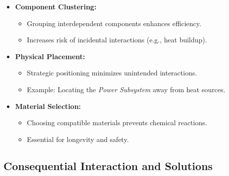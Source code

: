 \documentclass[12pt]{report}
\begin{document}
\begin{itemize}
    \item \textbf{Component Clustering:}
    \begin{itemize}
        \item Grouping interdependent components enhances efficiency.
        \item Increases risk of incidental interactions (e.g., heat buildup).
    \end{itemize}
    \item \textbf{Physical Placement:}
    \begin{itemize}
        \item Strategic positioning minimizes unintended interactions.
        \item Example: Locating the \textit{Power Subsystem} away from heat sources.
    \end{itemize}
    \item \textbf{Material Selection:}
    \begin{itemize}
        \item Choosing compatible materials prevents chemical reactions.
        \item Essential for longevity and safety.
    \end{itemize}
\end{itemize}

\subsection{Consequential Interaction and Solutions}
\end{document}
